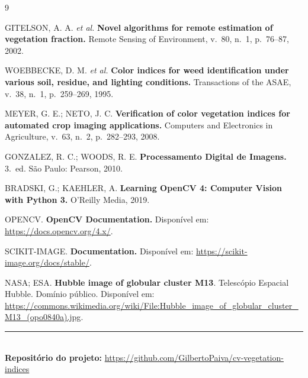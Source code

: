 \documentclass[12pt,a4paper]{article}
\begin{document}
\begin{thebibliography}{9}

GITELSON, A. A. \emph{et al.}
\textbf{Novel algorithms for remote estimation of vegetation fraction.}
Remote Sensing of Environment, v.~80, n.~1, p.~76--87, 2002.

WOEBBECKE, D. M. \emph{et al.}
\textbf{Color indices for weed identification under various soil, residue, and lighting
conditions.}
Transactions of the ASAE, v.~38, n.~1, p.~259--269, 1995.

MEYER, G. E.; NETO, J. C.
\textbf{Verification of color vegetation indices for automated crop imaging applications.}
Computers and Electronics in Agriculture, v.~63, n.~2, p.~282--293, 2008.

GONZALEZ, R. C.; WOODS, R. E.
\textbf{Processamento Digital de Imagens.} 3.~ed. São Paulo: Pearson, 2010.

BRADSKI, G.; KAEHLER, A.
\textbf{Learning OpenCV 4: Computer Vision with Python 3.} O'Reilly Media, 2019.

OPENCV. \textbf{OpenCV Documentation.} Disponível em: \url{https://docs.opencv.org/4.x/}.

SCIKIT-IMAGE. \textbf{Documentation.} Disponível em: \url{https://scikit-image.org/docs/stable/}.

NASA; ESA. \textbf{Hubble image of globular cluster M13}. Telescópio Espacial Hubble.
Domínio público. Disponível em:
\url{https://commons.wikimedia.org/wiki/File:Hubble_image_of_globular_cluster_M13_(opo0840a).jpg}.

\end{thebibliography}

\vspace{1cm}
\noindent\rule{\textwidth}{0.4pt}\\
\small \textbf{Repositório do projeto:}
\url{https://github.com/GilbertoPaiva/cv-vegetation-indices}
\end{document}

